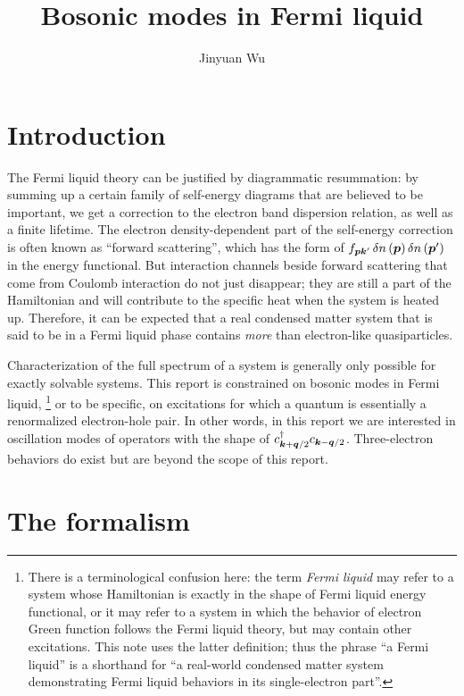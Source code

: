 \documentclass[hyperref, a4paper]{article}
\title{Bosonic modes in Fermi liquid}
\author{Jinyuan Wu}
\newcommand*{\term}[1]{\textit{#1}}
\begin{document}
\maketitle

\section{Introduction}

The Fermi liquid theory can be justified by diagrammatic resummation: 
by summing up a certain family of self-energy diagrams
that are believed to be important, 
we get a correction to the electron band dispersion relation,
as well as a finite lifetime.
The electron density-dependent part of the self-energy correction 
is often known as ``forward scattering'',
which has the form of $f_{\vb*{p} \vb*{k}'} \var{n}(\vb*{p}) \var{n}(\vb*{p}')$ 
in the energy functional.
But interaction channels beside forward scattering 
that come from Coulomb interaction do not just disappear;
they are still a part of the Hamiltonian
and will contribute to the specific heat 
when the system is heated up.
Therefore, it can be expected that a real condensed matter system 
that is said to be in a Fermi liquid phase 
contains \emph{more} than electron-like quasiparticles. 

Characterization of the full spectrum of a system is 
generally only possible for exactly solvable systems. 
This report is constrained on bosonic modes in Fermi liquid,%
\footnote{
    There is a terminological confusion here: 
    the term \term{Fermi liquid} may refer to 
    a system whose Hamiltonian is exactly in the shape of 
    Fermi liquid energy functional,
    or it may refer to a system 
    in which the behavior of electron Green function 
    follows the Fermi liquid theory, 
    but may contain other excitations.
    This note uses the latter definition;
    thus the phrase ``a Fermi liquid'' 
    is a shorthand for ``a real-world condensed matter system 
    demonstrating Fermi liquid behaviors in its single-electron part''.
}
or to be specific, on excitations 
for which a quantum is essentially a renormalized electron-hole pair.
In other words, in this report 
we are interested in oscillation modes of 
operators with the shape of $c^\dagger_{\vb*{k} + \vb*{q} / 2} c_{\vb*{k} - \vb*{q} / 2}$.
Three-electron behaviors do exist \cite{patton2003trion,singh2016trion}
but are beyond the scope of this report.

\section{The formalism}
\end{document}
